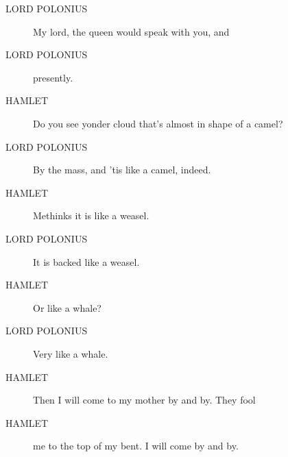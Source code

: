 \documentclass{article}
\begin{document}
\begin{description}
            
\item[LORD POLONIUS] My lord, the queen would speak with you, and
\item[LORD POLONIUS] presently.
\end{description}
          
\begin{description}
            
\item[HAMLET] Do you see yonder cloud that's almost in shape of a camel?
\end{description}
          
\begin{description}
            
\item[LORD POLONIUS] By the mass, and 'tis like a camel, indeed.
\end{description}
          
\begin{description}
            
\item[HAMLET] Methinks it is like a weasel.
\end{description}
          
\begin{description}
            
\item[LORD POLONIUS] It is backed like a weasel.
\end{description}
          
\begin{description}
            
\item[HAMLET] Or like a whale?
\end{description}
          
\begin{description}
            
\item[LORD POLONIUS] Very like a whale.
\end{description}
          
\begin{description}
            
\item[HAMLET] Then I will come to my mother by and by. They fool
\item[HAMLET] me to the top of my bent. I will come by and by.
\end{description}
          
\end{document}

